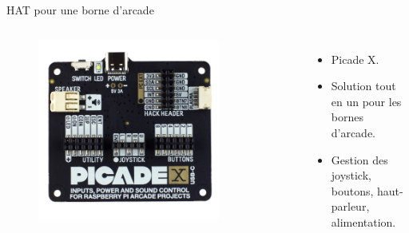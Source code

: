 \documentclass[aspectratio=169,xcolor=dvipsnames]{beamer}
\begin{document}
\begin{frame}{HAT pour une borne d'arcade}
    \begin{columns}[c] %

        \begin{figure}
            \includegraphics[width=0.8\textwidth]{images/picade_hat.jpg}
        \end{figure}

        \begin{itemize}
            \item Picade X.
            \item Solution tout en un pour les bornes d'arcade.
            \item Gestion des joystick, boutons, haut-parleur, alimentation.
        \end{itemize}

    \end{columns}
\end{frame}
\end{document}

